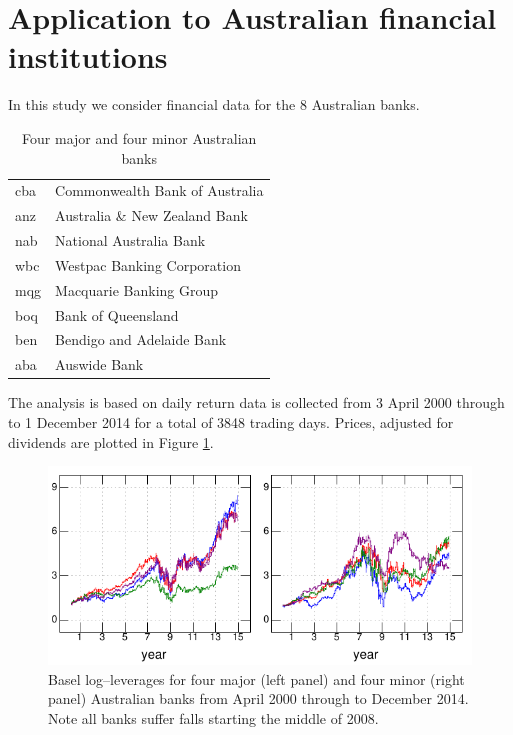 \documentclass[authoryear]{elsarticle}
\newcommand{\fref}[1]{Figure \ref{#1}}
\begin{document}
\section{Application to Australian financial institutions}

In this study we consider financial data for  the 8 Australian banks.

\begin{table}[htdp]
\caption{Four major and four minor Australian banks}
\begin{center}
\begin{tabular}{l|l}
\hline
cba & Commonwealth Bank of Australia\\
anz & Australia \& New Zealand Bank\\
nab & National Australia Bank\\
wbc & Westpac Banking Corporation\\
\hline
mqg & Macquarie Banking Group\\
boq & Bank of Queensland\\
ben & Bendigo and Adelaide Bank\\
aba & Auswide Bank\\
\hline
\end{tabular}
\end{center}
\label{banks}
\end{table}%


The analysis is based on daily return data is collected from   3 April 2000 through to 1 December 2014 for a total of  3848 trading days.
Prices, adjusted for dividends are plotted in \fref{prices}.

\begin{figure}[htbp]
\begin{center}
\includegraphics{prices.pdf}
\caption{Basel log--leverages for four major (left panel) and four minor (right panel) Australian banks from April 2000 through to December 2014.  Note all banks suffer  falls starting the middle of 2008.}
\label{prices}
\end{center}
\end{figure}
 
\end{document}
